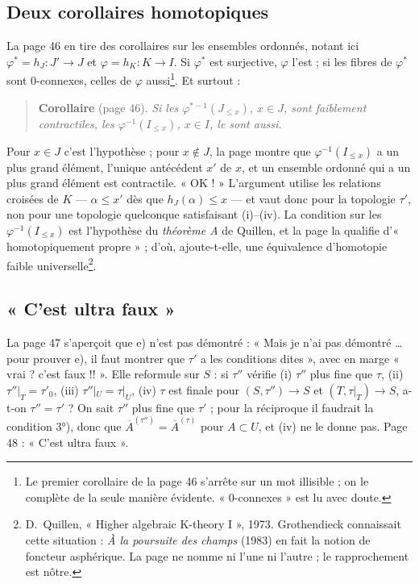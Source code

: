 \documentclass[11pt,a4paper]{article}
\begin{document}
\subsection*{Deux corollaires homotopiques}

La page 46 en tire des corollaires sur les ensembles ordonnés, notant ici
$\varphi^{*} = h_{J} : J' \to J$ et $\varphi = h_{K} : K \to I$. Si $\varphi^{*}$
est surjective, $\varphi$ l'est ; si les fibres de $\varphi^{*}$ sont
0-connexes, celles de $\varphi$ aussi\footnote{Le premier corollaire de la
page 46 s'arrête sur un mot illisible ; on le complète de la seule manière
évidente. « 0-connexes » est lu avec doute.}. Et surtout :

\begin{quote}
\textbf{Corollaire} (page 46). \emph{Si les $\varphi^{*-1}(J_{\leq x})$, $x \in
J$, sont faiblement contractiles, les $\varphi^{-1}(I_{\leq x})$, $x \in I$, le
sont aussi.}
\end{quote}

\noindent Pour $x \in J$ c'est l'hypothèse ; pour $x \notin J$, la page montre
que $\varphi^{-1}(I_{\leq x})$ a un plus grand élément, l'unique antécédent $x'$
de $x$, et un ensemble ordonné qui a un plus grand élément est contractile.
« OK ! » L'argument utilise les relations croisées de $K$ --- $\alpha \leq x'$
dès que $h_{J}(\alpha) \leq x$ --- et vaut donc pour la topologie $\tau'$, non
pour une topologie quelconque satisfaisant (i)--(iv). La condition sur les
$\varphi^{-1}(I_{\leq x})$ est l'hypothèse du \emph{théorème A} de Quillen, et
la page la qualifie d'« homotopiquement propre » ; d'où, ajoute-t-elle, une
équivalence d'homotopie faible universelle\footnote{D.~Quillen, « Higher
algebraic K-theory I », 1973. Grothendieck connaissait cette situation : \emph{À
la poursuite des champs} (1983) en fait la notion de foncteur asphérique. La page
ne nomme ni l'une ni l'autre ; le rapprochement est nôtre.}.

\subsection*{« C'est ultra faux »}

La page 47 s'aperçoit que e) n'est pas démontré : « Mais je n'ai pas démontré
\ldots{} pour prouver e), il faut montrer que $\tau'$ a les conditions dites »,
avec en marge « vrai ? c'est faux !! ». Elle reformule sur $S$ : si $\tau''$
vérifie (i) $\tau''$ plus fine que $\tau$, (ii) $\tau''|_{T} = \tau'_{0}$, (iii)
$\tau''|_{U} = \tau|_{U}$, (iv) $\tau$ est finale pour $(S, \tau'') \to S$ et
$(T, \tau|_{T}) \to S$, a-t-on $\tau'' = \tau'$ ? On sait $\tau''$ plus fine que
$\tau'$ ; pour la réciproque il faudrait la condition 3°), donc que
$\overline{A}^{(\tau'')} = \overline{A}^{(\tau)}$ pour $A \subset U$, et (iv) ne
le donne pas. Page 48 : « C'est ultra faux ».
\end{document}
